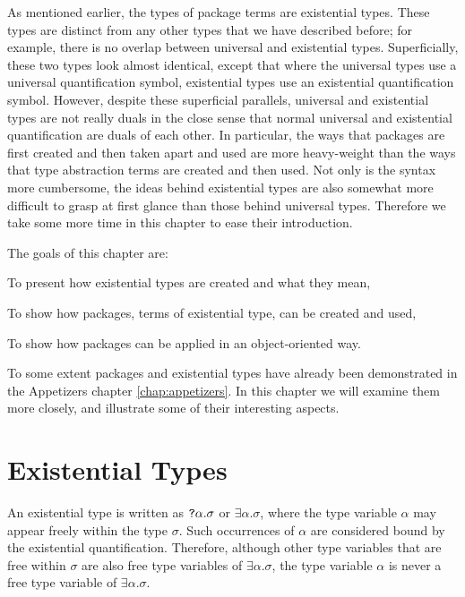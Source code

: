 As mentioned earlier, the types of package terms are
existential types. These types are distinct from any other types
that we have described before; for example, there is no overlap between
universal and existential types.
Superficially, these two types look almost identical, except that where 
the universal types use a universal quantification symbol,  
existential types use an existential quantification symbol.
However, despite these superficial parallels, universal and
existential types are not really duals in the close sense that 
normal universal
and existential quantification are duals of each other.
In particular, the ways that packages are first created and then
taken apart and used are more heavy-weight than the ways that
type abstraction terms are created and then used. Not only is
the syntax more cumbersome, the ideas behind existential types
are also somewhat more difficult to grasp at first glance than 
those behind universal types. 
Therefore we take some more time in this chapter to 
ease their introduction.

The goals of this chapter are:

\begin{myenumerate}
\item To present how existential types are created and what they mean,
\item To show how packages, terms of existential type, can be created and used,
\item To show how packages can be applied in an object-oriented way.
\end{myenumerate}

To some extent packages and existential types have already been demonstrated
in the Appetizers chapter \ref{chap:appetizers}. In this chapter we will examine
them more closely, 
and illustrate some of their interesting aspects.

\section{Existential Types}

An existential type is written as $\mbox{\tt ?}\alpha.\sigma$ or
$\exists\alpha.\sigma$, where the type
variable $\alpha$ may appear freely within the type $\sigma$. 
Such occurrences of $\alpha$ are
considered bound by the existential quantification. 
Therefore, although other type variables
that are free within $\sigma$ are also free type variables of
$\exists\alpha.\sigma$, the type variable $\alpha$ is never a free type
variable of $\exists\alpha.\sigma$.

